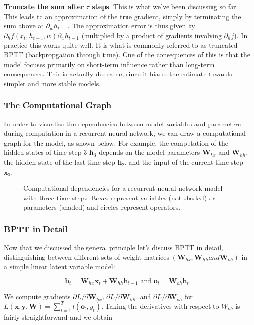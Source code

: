 \textbf{Truncate the sum after $\tau$ steps}. This is what we’ve been discussing so far. This leads to an approximation of the true gradient, simply by terminating the sum above at $\partial_w h_{t-\tau}$. The approximation error is thus given by $\partial_h f(x_t, h_{t-1}, w) \partial_w h_{t-1}$ (multiplied by a product of gradients involving $\partial_h f$). In practice this works quite well. It is what is commonly referred to as truncated BPTT (backpropgation through time). One of the consequences of this is that the model focuses primarily on short-term influence rather than long-term consequences. This is actually desirable, since it biases the estimate towards simpler and more stable models.

\subsubsection{The Computational Graph}

In order to visualize the dependencies between model variables and parameters during computation in a recurrent neural network, we can draw a computational graph for the model, as shown below. For example, the computation of the hidden states of time step 3 $\mathbf{h}_3$ depends on the model parameters $\mathbf{W}_{hx}$ and $\mathbf{W}_{hh}$, the hidden state of the last time step $\mathbf{h}_2$, and the input of the current time step $\mathbf{x}_3.$

\begin{figure}[hpt]
	\centering
	
	\caption{Computational dependencies for a recurrent neural network model with three time steps. Boxes represent variables (not shaded) or parameters (shaded) and circles represent operators.}
	\label{fig:rnn-bptt}
\end{figure}

\subsubsection{BPTT in Detail}

Now that we discussed the general principle let’s discuss BPTT in detail, distinguishing between different sets of weight matrices $(\mathbf{W}_{hx}, \mathbf{W}_{hh} and \mathbf{W}_{oh})$ in a simple linear latent variable model:

$$\mathbf{h}_t = \mathbf{W}_{hx} \mathbf{x}_t + \mathbf{W}_{hh} \mathbf{h}_{t-1} \text{ and }\mathbf{o}_t = \mathbf{W}_{oh} \mathbf{h}_t$$

We compute gradients $\partial L/\partial \mathbf{W}_{hx}$, $\partial L/\partial \mathbf{W}_{hh}$, and $\partial L/\partial \mathbf{W}_{oh}$ for $L(\mathbf{x}, \mathbf{y}, \mathbf{W}) = \sum_{t=1}^T l(\mathbf{o}_t, y_t)$. Taking the derivatives with respect to $W_{oh}$ is fairly straightforward and we obtain

